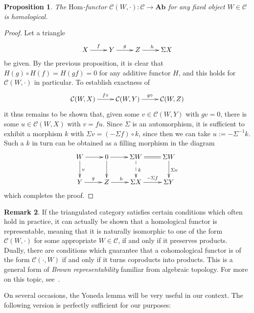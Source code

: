 \documentclass{amsproc}
\newtheorem{prop}{Proposition}[section]
\theoremstyle{definition}
\newtheorem{rem}[prop]{Remark}
\begin{document}
\begin{prop}
\label{homhom}
The $\mathrm{Hom}$-functor ${\mathcal{C}}(W,\cdot):{\mathcal{C}}{\longrightarrow}{\mathbf{Ab}}$ for any fixed object $W\in{\mathcal{C}}$ is homological.
\end{prop}

\begin{proof}
Let a triangle
\begin{displaymath}
\xymatrix{X\ar[r]^f & Y\ar[r]^g & Z\ar[r]^h & {}\Sigma X}
\end{displaymath}
be given. By the previous proposition, it is clear that $H(g)\circ H(f)=H(gf)=0$ for any additive functor $H$, and this holds for ${\mathcal{C}}(W,\cdot)$ in particular. To establish exactness of
\begin{displaymath}
\xymatrix{ {{\mathcal{C}}(W,X)}\ar[r]^{f\circ} & {\mathcal{C}}(W,Y)\ar[r]^{g\circ} & {\mathcal{C}}(W,Z)}
\end{displaymath}
it thus remains to be shown that, given some $v\in{\mathcal{C}}(W,Y)$ with $gv=0$, there is some $u\in{\mathcal{C}}(W,X)$ with $v=fu$. Since $\Sigma$ is an automorphism, it is sufficient to exhibit a morphism $k$ with $\Sigma v=(-\Sigma f)\circ k$, since then we can take $u:=-\Sigma^{-1}k$. Such a $k$ in turn can be obtained as a filling morphism in the diagram
\begin{displaymath}
\xymatrix{W\ar[r]\ar[d]^v & 0 \ar[r]\ar[d] & {}\Sigma W\ar@{=}[r]\ar@{-->}[d]^k & {}\Sigma W\ar[d]^{\Sigma v}\\
Y\ar[r]^g & Z\ar[r]^h & {}\Sigma X\ar[r]^{-\Sigma f} & {}\Sigma Y}
\end{displaymath}
which completes the proof.
\end{proof}

\begin{rem}
\label{brownrep}
If the triangulated category satisfies certain conditions which often hold in practice, it can actually be shown that a homological functor is representable, meaning that it is naturally isomorphic to one of the form ${\mathcal{C}}(W,\cdot)$ for some appropriate $W\in{\mathcal{C}}$, if and only if it preserves products. Dually, there are conditions which guarantee that a cohomological functor is of the form ${\mathcal{C}}(\cdot,W)$ if and only if it turns coproducts into products. This is a general form of \emph{Brown representability} familiar from algebraic topology. For more on this topic, see~\cite[Ch. 8]{Nee}.
\end{rem}

On several occasions, the Yoneda lemma will be very useful in our context. The following version is perfectly sufficient for our purposes:
\end{document}
